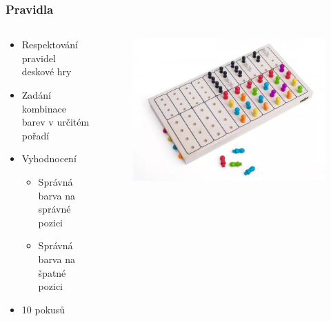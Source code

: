 \documentclass[%
  12pt,       				%
	t,                  %
	aspectratio=1610,   %
	unicode,						%
]{beamer}				    	%
\begin{document}
\begin{frame} 
	\frametitle{Pravidla}
	\begin{columns}[T] 								%
		\begin{column}{0.5\textwidth}		%
			\vspace{0.5cm}
			\begin{itemize}
				\item Respektování pravidel deskové hry
				\item Zadání kombinace barev v určitém pořadí
				\item Vyhodnocení
				\begin{itemize}
					\item Správná barva na správné pozici
					\item Správná barva na špatné pozici
				\end{itemize}
				\item 10 pokusů
			\end{itemize}
		\end{column}
		\begin{column}{0.5\textwidth}		%
			\begin{figure}%
				\centering
				\vspace{0.5cm}	              %
				\includegraphics[width=1.1\columnwidth]{obrazky/Logic_deskovka.png}
			\end{figure}
		\end{column}
	\end{columns}	
\end{frame} 
\end{document}
